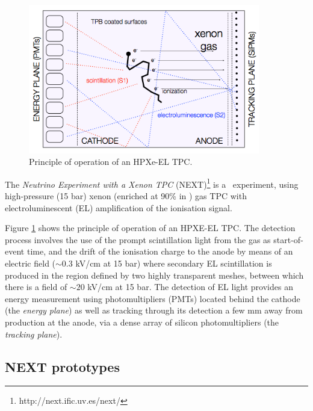 
\begin{figure}
\centering
\includegraphics[width=0.9\textwidth]{img2/EL.png}
\caption{\small Principle of operation of an HPXe-EL TPC. 
} \label{fig.EL}
\end{figure}

The \emph{Neutrino Experiment with a Xenon TPC} (NEXT)\footnote{http://next.ific.uv.es/next/}  is a \bbonu\ experiment, using high-pressure (15 bar) xenon (enriched at 90\% in \XE) gas TPC with electroluminescent (EL) amplification of the ionisation signal. 

Figure \ref{fig.EL} shows the principle of operation of an HPXE-EL TPC. The detection process involves the use of the prompt scintillation light from the gas as start-of-event time, and the drift of the ionisation charge to the anode by means of an electric field ($\sim0.3$ kV/cm at 15 bar) where secondary EL scintillation is produced in the region defined by two highly transparent meshes, between which there is a field of $\sim20$ kV/cm at 15 bar. The detection of EL light provides an energy measurement using photomultipliers (PMTs) located behind the cathode (the \emph{energy plane}) as well as tracking through its detection a few mm away from production at the anode, via a dense array of silicon photomultipliers (the \emph{tracking plane}).

\subsection{NEXT prototypes}

